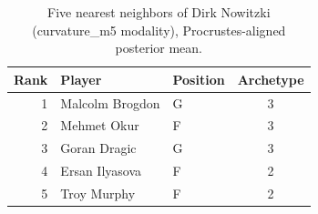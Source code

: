 \begin{table}[htbp]
  \centering\small
  \begin{tabular}{rllc}
    \toprule
    Rank & Player & Position & Archetype \\
    \midrule
    1 & Malcolm Brogdon & G & 3 \\
    2 & Mehmet Okur & F & 3 \\
    3 & Goran Dragic & G & 3 \\
    4 & Ersan Ilyasova & F & 2 \\
    5 & Troy Murphy & F & 2 \\
    \bottomrule
  \end{tabular}
  \caption{Five nearest neighbors of Dirk Nowitzki (curvature_m5 modality), Procrustes-aligned posterior mean.}
  \label{tab:Dirk_Nowitzki_neighbors_curvature_m5}
\end{table}

